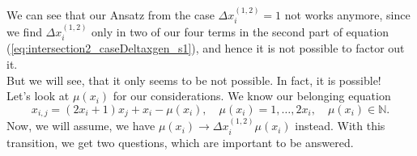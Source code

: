 We can see that our Ansatz from the case $\Delta x_{i}^{\left(1,2\right)} = 1$ not works anymore, since we find $\Delta x_{i}^{\left(1,2\right)}$ only in two of our four terms in the second part of equation (\ref{eq:intersection2_caseDeltaxgen_s1}), and hence it is not possible to factor out it.\\
But we will see, that it only seems to be not possible. In fact, it is possible!\\

Let's look at $\mu\left(x_{i}\right)$ for our considerations. We know our belonging equation
\[ x_{i,j} = \left(2x_{i} + 1\right)x_{j} + x_{i} - \mu\left(x_{i}\right), \quad \mu\left(x_{i}\right) = 1,\dots,2x_{i}, \quad \mu\left(x_{i}\right) \in \mathbb{N}. \]
Now, we will assume, we have $\mu\left(x_{i}\right) \rightarrow \Delta x_{i}^{\left(1,2\right)}\mu\left(x_{i}\right)$ instead. With this transition, we get two questions, which are important to be answered.

